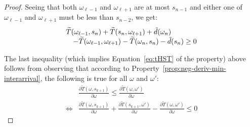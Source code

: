 \begin{proof}
Seeing that both $\omega_{\ell-1}$ and $\omega_{\ell+1}$ are at most $s_{n-1}$ and either one of $\omega_{\ell-1}$ and $\omega_{\ell+1}$  must be less than $s_{n-2}$, we get:
\begin{equation}
\begin{array}{ll}
    \lefteqn{\widetilde{T}(\omega_{\ell-1}, s_n)  +\widetilde{T}(s_n,\omega_{\ell+1}) + \tilde{d}(\omega_n)} &\\
    &- \widetilde{T}(\omega_{\ell-1},\omega_{\ell+1}) - \widetilde{T}(\omega_n, s_{n})  - \tilde{d}(s_n) \geq 0
\end{array}
\end{equation}

\noindent The last inequality (which implies Equation~\ref{eq:tHST} of the property) above follows from observing that according to Property~\ref{prop:neg-deriv-min-interarrival}, the following is true for all $\omega$ and $\omega'$:
\begin{equation}
\begin{array}{ll}
        &\frac{\partial \widetilde{T}(\omega,s_{k+1})}{\partial \omega}
            \leq \frac{\partial \widetilde{T}(\omega,\omega')}{\partial \omega} \nonumber\\
        \Leftrightarrow&
        \frac{\partial \widetilde{T}(\omega,s_{k+1})}{\partial \omega} + \frac{\partial \widetilde{T}(s_{k+1},\omega')}{\partial \omega} - \frac{\partial \widetilde{T}(\omega,\omega')}{\partial \omega} \leq 0 \nonumber  
\end{array}
\end{equation}
\end{proof}
